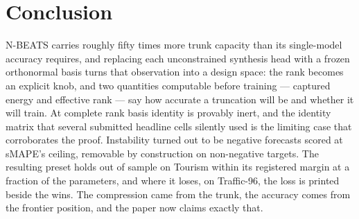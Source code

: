 \section{Conclusion}
\label{sec:conclusion}

N-BEATS carries roughly fifty times more trunk capacity than its
single-model accuracy requires, and replacing each unconstrained
synthesis head with a frozen orthonormal basis turns that observation
into a design space: the rank becomes an explicit knob, and two
quantities computable before training --- captured energy and effective
rank --- say how accurate a truncation will be and whether it will train.
At complete rank basis identity is provably inert, and the identity
matrix that several submitted headline cells silently used is the
limiting case that corroborates the proof. Instability turned out to be
negative forecasts scored at sMAPE's ceiling, removable by construction
on non-negative targets. The resulting preset holds out of sample on
Tourism within its registered margin at a fraction of the parameters,
and where it loses, on Traffic-96, the loss is printed beside the wins.
The compression came from the trunk, the accuracy comes from the
frontier position, and the paper now claims exactly that.
